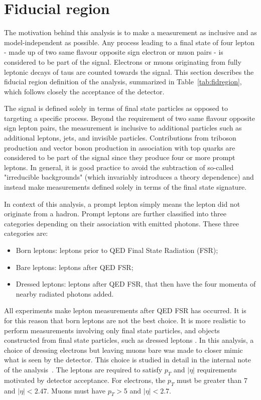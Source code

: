 \section{Fiducial region}
\label{sec:signaldef}
The motivation behind this analysis is to make a measurement as inclusive and as model-independent as possible. Any process leading to a final state of four lepton - made up of two same flavour opposite sign electron or muon pairs - is considered to be part of the signal. Electrons or muons originating from fully leptonic decays of taus are counted towards the signal. This section describes the fiducial region definition of the analysis, summarized in Table~\ref{tab:fidregion}, which follows closely the acceptance of the detector. 

The signal is defined solely in terms of final state particles as opposed to targeting a specific process. Beyond the requirement of two same flavour opposite sign lepton pairs, the measurement is inclusive to additional particles such as additional leptons, jets, and invisible particles. Contributions from triboson production and vector boson production in association with top quarks are considered to be part of the signal since they produce four or more prompt leptons. In general, it is good practice to avoid the subtraction of so-called "irreducible backgrounds" (which invariably introduces a theory dependence) and instead make measurements defined solely in terms of the final state signature. 

In context of this analysis, a prompt lepton simply means the lepton did not originate from a hadron. Prompt leptons are further classified into three categories depending on their association with emitted photons. These three categories are:
\begin{itemize}
    \item Born leptons: leptons prior to QED Final State Radiation (FSR);
    \item Bare leptons: leptons after QED FSR;
    \item Dressed leptons: leptons after QED FSR, that then have the four momenta of nearby radiated photons added. 
\end{itemize}
All experiments make lepton measurements after QED FSR has occurred. It is for this reason that born leptons are not the best choice. It is more realistic to perform measurements involving only final state particles, and objects constructed from final state particles, such as dressed leptons \cite{Kar:ab1be6}. In this analysis, a choice of dressing electrons but leaving muons bare was made to closer mimic what is seen by the detector. This choice is studied in detail in the internal note of the analysis~\cite{m4l_internalnote}. The leptons are required to satisfy $p_T$ and $|\eta|$ requirements motivated by detector acceptance. For electrons, the $p_T$ must be greater than \unit{7}{\GeV} and $|\eta|<2.47$. Muons must have $p_T > $\unit{5}{\GeV} and $|\eta|<2.7$.

